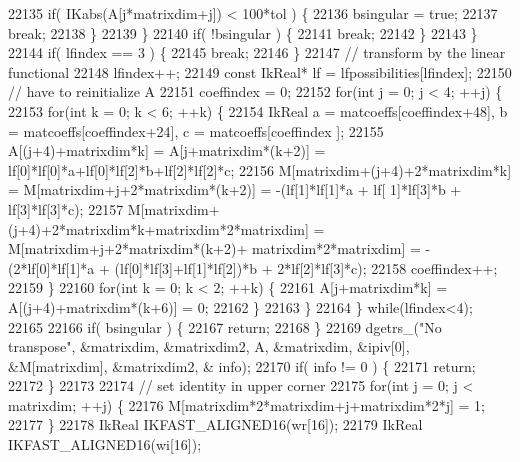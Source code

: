 \begin{DoxyCode}
22135                 \textcolor{keywordflow}{if}( IKabs(A[j*matrixdim+j]) < 100*tol ) \{
22136                     bsingular = \textcolor{keyword}{true};
22137                     \textcolor{keywordflow}{break};
22138                 \}
22139             \}
22140             \textcolor{keywordflow}{if}( !bsingular ) \{
22141                 \textcolor{keywordflow}{break};
22142             \}
22143         \}
22144         \textcolor{keywordflow}{if}( lfindex == 3 ) \{
22145             \textcolor{keywordflow}{break};
22146         \}
22147         \textcolor{comment}{// transform by the linear functional}
22148         lfindex++;
22149         \textcolor{keyword}{const} IkReal* lf = lfpossibilities[lfindex];
22150         \textcolor{comment}{// have to reinitialize A}
22151         coeffindex = 0;
22152         \textcolor{keywordflow}{for}(\textcolor{keywordtype}{int} j = 0; j < 4; ++j) \{
22153             \textcolor{keywordflow}{for}(\textcolor{keywordtype}{int} k = 0; k < 6; ++k) \{
22154                 IkReal a = matcoeffs[coeffindex+48], b = matcoeffs[coeffindex+24], c = matcoeffs[coeffindex
      ];
22155                 A[(j+4)+matrixdim*k] = A[j+matrixdim*(k+2)] = lf[0]*lf[0]*a+lf[0]*lf[2]*b+lf[2]*lf[2]*c;
22156                 M[matrixdim+(j+4)+2*matrixdim*k] = M[matrixdim+j+2*matrixdim*(k+2)] = -(lf[1]*lf[1]*a + lf[
      1]*lf[3]*b + lf[3]*lf[3]*c);
22157                 M[matrixdim+(j+4)+2*matrixdim*k+matrixdim*2*matrixdim] = M[matrixdim+j+2*matrixdim*(k+2)+
      matrixdim*2*matrixdim] = -(2*lf[0]*lf[1]*a + (lf[0]*lf[3]+lf[1]*lf[2])*b + 2*lf[2]*lf[3]*c);
22158                 coeffindex++;
22159             \}
22160             \textcolor{keywordflow}{for}(\textcolor{keywordtype}{int} k = 0; k < 2; ++k) \{
22161                 A[j+matrixdim*k] = A[(j+4)+matrixdim*(k+6)] = 0;
22162             \}
22163         \}
22164     \} \textcolor{keywordflow}{while}(lfindex<4);
22165 
22166     \textcolor{keywordflow}{if}( bsingular ) \{
22167         \textcolor{keywordflow}{return};
22168     \}
22169     dgetrs\_(\textcolor{stringliteral}{"No transpose"}, &matrixdim, &matrixdim2, A, &matrixdim, &ipiv[0], &M[matrixdim], &matrixdim2, &
      info);
22170     \textcolor{keywordflow}{if}( info != 0 ) \{
22171         \textcolor{keywordflow}{return};
22172     \}
22173 
22174     \textcolor{comment}{// set identity in upper corner}
22175     \textcolor{keywordflow}{for}(\textcolor{keywordtype}{int} j = 0; j < matrixdim; ++j) \{
22176         M[matrixdim*2*matrixdim+j+matrixdim*2*j] = 1;
22177     \}
22178     IkReal IKFAST\_ALIGNED16(wr[16]);
22179     IkReal IKFAST\_ALIGNED16(wi[16]);

\end{DoxyCode}
